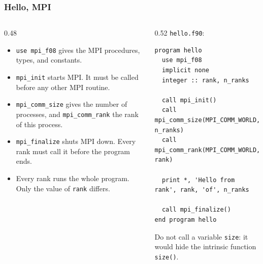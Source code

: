 \begin{frame}[fragile]
  \frametitle{Hello, MPI}
  \begin{columns}[T]
    \begin{column}{0.48\textwidth}
      \begin{itemize}
        \item \texttt{use mpi\_f08} gives the MPI procedures, types, and constants.
        \item \texttt{mpi\_init} starts MPI. It must be called before any other MPI routine.
        \item \texttt{mpi\_comm\_size} gives the number of processes, and \texttt{mpi\_comm\_rank} the rank of this process.
        \item \texttt{mpi\_finalize} shuts MPI down. Every rank must call it before the program ends.
        \item Every rank runs the whole program. Only the value of \texttt{rank} differs.
      \end{itemize}
    \end{column}

    \begin{column}{0.52\textwidth}
      \texttt{hello.f90}:
\begin{lstlisting}
program hello
  use mpi_f08
  implicit none
  integer :: rank, n_ranks

  call mpi_init()
  call mpi_comm_size(MPI_COMM_WORLD, n_ranks)
  call mpi_comm_rank(MPI_COMM_WORLD, rank)

  print *, 'Hello from rank', rank, 'of', n_ranks

  call mpi_finalize()
end program hello
\end{lstlisting}

      \vspace*{1mm}
      \footnotesize Do not call a variable \texttt{size}: it would hide the intrinsic function \texttt{size()}.
    \end{column}
  \end{columns}
\end{frame}


